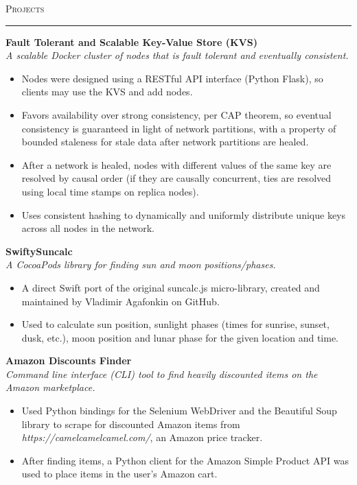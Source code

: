 \documentclass{res}
\begin{document}
\begin{resume}
\textsc{{\Large Projects}}
\vspace{0.5mm}
\hrule width18.5cm
\textbf{Fault Tolerant and Scalable Key-Value Store (KVS)}\\
\textit{A scalable Docker cluster of nodes that is fault tolerant and eventually consistent.}
	\vspace{2mm}
	\begin{itemize}
		\item Nodes were designed using a RESTful API interface (Python Flask), so clients may use the KVS and add nodes.
		\item Favors availability over strong consistency, per CAP theorem, so eventual consistency is guaranteed in light of network partitions, with a property of bounded staleness for stale data after network partitions are healed.
		\item After a network is healed, nodes with different values of the same key are resolved by causal order (if they are causally concurrent, ties are resolved using local time stamps on replica nodes).
		\item Uses consistent hashing to dynamically and uniformly distribute unique keys across all nodes in the network.
	\end{itemize}
\textbf{SwiftySuncalc}\\
\textit{A CocoaPods library for finding sun and moon positions/phases.}
	\vspace{2mm}
	\begin{itemize}
		\item A direct Swift port of the original suncalc.js micro-library, created and maintained by Vladimir Agafonkin on GitHub.
		\item Used to calculate sun position, sunlight phases (times for sunrise, sunset, dusk, etc.), moon position and lunar phase for the given location and time.
  \end{itemize}
\textbf{Amazon Discounts Finder}\\
\textit{Command line interface (CLI) tool to find heavily discounted items on the Amazon marketplace.}
	\vspace{2mm}
	\begin{itemize}
		\item Used Python bindings for the Selenium WebDriver and the Beautiful Soup library to scrape for discounted Amazon items from \textit{https://camelcamelcamel.com/}, an Amazon price tracker.
		\item After finding items, a Python client for the Amazon Simple Product API was used to place items in the user's Amazon cart.
	\end{itemize}


\end{resume}
\end{document}
